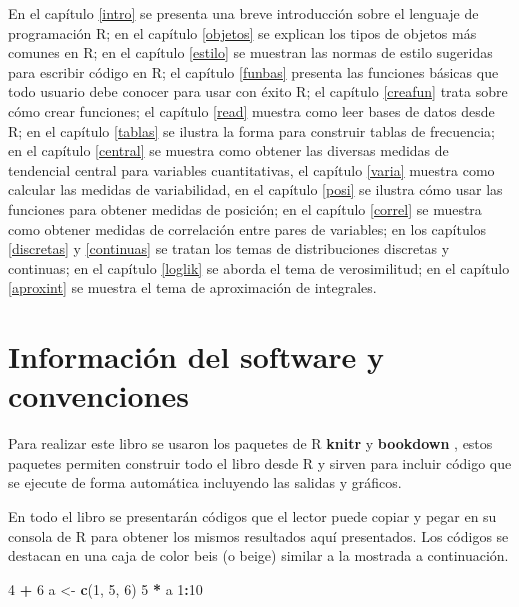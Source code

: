 \documentclass[10pt,]{krantz}
\makeatletter
\newenvironment{Shaded}{\begin{snugshade}}{\end{snugshade}}
\newcommand{\KeywordTok}[1]{\textcolor[rgb]{0.13,0.29,0.53}{\textbf{#1}}}
\newcommand{\DecValTok}[1]{\textcolor[rgb]{0.00,0.00,0.81}{#1}}
\newcommand{\StringTok}[1]{\textcolor[rgb]{0.31,0.60,0.02}{#1}}
\newcommand{\OperatorTok}[1]{\textcolor[rgb]{0.81,0.36,0.00}{\textbf{#1}}}
\newcommand{\NormalTok}[1]{#1}
\let\proglang=\textsf
\newenvironment{kframe}{%
\medskip{}
\setlength{\fboxsep}{.8em}
 \def\at@end@of@kframe{}%
 \ifinner\ifhmode%
  \def\at@end@of@kframe{\end{minipage}}%
  \begin{minipage}{\columnwidth}%
 \fi\fi%
 \def\FrameCommand##1{\hskip\@totalleftmargin \hskip-\fboxsep
 \colorbox{shadecolor}{##1}\hskip-\fboxsep
     \hskip-\linewidth \hskip-\@totalleftmargin \hskip\columnwidth}%
 \MakeFramed {\advance\hsize-\width
   \@totalleftmargin\z@ \linewidth\hsize
   \@setminipage}}%
 {\par\unskip\endMakeFramed%
 \at@end@of@kframe}
\renewenvironment{Shaded}{\begin{kframe}}{\end{kframe}}
\makeatother
\begin{document}
En el capítulo \ref{intro} se presenta una breve introducción sobre el
lenguaje de programación \proglang{R}; en el capítulo \ref{objetos} se
explican los tipos de objetos más comunes en \proglang{R}; en el
capítulo \ref{estilo} se muestran las normas de estilo sugeridas para
escribir código en \proglang{R}; el capítulo \ref{funbas} presenta las
funciones básicas que todo usuario debe conocer para usar con éxito
\proglang{R}; el capítulo \ref{creafun} trata sobre cómo crear
funciones; el capítulo \ref{read} muestra como leer bases de datos desde
\proglang{R}; en el capítulo \ref{tablas} se ilustra la forma para
construir tablas de frecuencia; en el capítulo \ref{central} se muestra
como obtener las diversas medidas de tendencial central para variables
cuantitativas, el capítulo \ref{varia} muestra como calcular las medidas
de variabilidad, en el capítulo \ref{posi} se ilustra cómo usar las
funciones para obtener medidas de posición; en el capítulo \ref{correl}
se muestra como obtener medidas de correlación entre pares de variables;
en los capítulos \ref{discretas} y \ref{continuas} se tratan los temas
de distribuciones discretas y continuas; en el capítulo \ref{loglik} se
aborda el tema de verosimilitud; en el capítulo \ref{aproxint} se
muestra el tema de aproximación de integrales.

\section*{Información del software y
convenciones}\label{informacion-del-software-y-convenciones}


Para realizar este libro se usaron los paquetes de \proglang{R}
\textbf{knitr} \citep{xie2015} y
\textbf{bookdown} \citep{R-bookdown}, estos paquetes
permiten construir todo el libro desde \proglang{R} y sirven para
incluir código que se ejecute de forma automática incluyendo las salidas
y gráficos.

En todo el libro se presentarán códigos que el lector puede copiar y
pegar en su consola de \proglang{R} para obtener los mismos resultados
aquí presentados. Los códigos se destacan en una caja de color beis (o
beige) similar a la mostrada a continuación.

\begin{Shaded}
\begin{Highlighting}[]
\DecValTok{4} \OperatorTok{+}\StringTok{ }\DecValTok{6}
\NormalTok{a <-}\StringTok{ }\KeywordTok{c}\NormalTok{(}\DecValTok{1}\NormalTok{, }\DecValTok{5}\NormalTok{, }\DecValTok{6}\NormalTok{)}
\DecValTok{5} \OperatorTok{*}\StringTok{ }\NormalTok{a}
\DecValTok{1}\OperatorTok{:}\DecValTok{10}
\end{Highlighting}
\end{Shaded}
\end{document}
